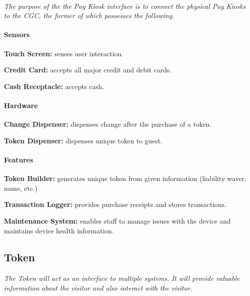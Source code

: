 \documentclass[12pt]{article}
\begin{document}
	\paragraph{} \textit{The purpose of the the Pay Kiosk interface is to connect 
	the physical Pay Kiosks to the CGC, the former of which possesses the following.}
	\paragraph{Sensors}
	\begin{list}{}{}
		\item \textbf{Touch Screen:} senses user interaction. 
		\item \textbf{Credit Card:} accepts all major credit and debit cards. 
		\item \textbf{Cash Receptacle:} accepts cash. 
	\end{list}
		
	\paragraph{Hardware}
	\begin{list}{}{}
		\item \textbf{Change Dispenser:} dispenses change after the purchase of a token.
		\item \textbf{Token Dispenser:} dispenses unique token to guest.
	\end{list}

	\paragraph{Features}
	\begin{list}{}{}
		\item \textbf{Token Builder:} generates unique token from given information (liability waver, name, etc.)
		\item \textbf{Transaction Logger:} provides purchase receipts and stores transactions.
		\item \textbf{Maintenance System:} enables staff to manage issues with the device	
		and maintains device health information. 
	\end{list}

	\subsection{Token}
	\paragraph{} \textit{The Token will act as an interface to multiple systems. 
	It will provide valuable information about the visitor and also interact with 
	the visitor.}
		
\end{document}
